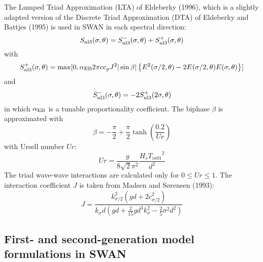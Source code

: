 \documentclass[12pt]{book}
\begin{document}
The Lumped Triad Approximation (LTA) of Eldeberky (1996), which is a slightly adapted version of the
Discrete Triad Approximation (DTA) of Eldeberky and Battjes (1995) is used in SWAN in each spectral direction:
\begin{equation}
  S_{\rm nl3} (\sigma,\theta) = S^-_{\rm nl3} (\sigma,\theta) + S^+_{\rm nl3} (\sigma,\theta)
  \label{eq3-33}
\end{equation}
with
\begin{equation}
  S^+_{\rm nl3} (\sigma,\theta) = \max [0,\alpha_{\rm EB} 2 \pi c c_g J^2 |\sin\beta| \left \{ E^2(\sigma/2,\theta) -
  2 E(\sigma/2,\theta) E(\sigma,\theta) \right \}]
  \label{eq3-34}
\end{equation}
and
\begin{equation}
  S^-_{\rm nl3} (\sigma,\theta) = -2 S^+_{\rm nl3} (2\sigma,\theta)
  \label{eq3-35}
\end{equation}
in which $\alpha _{\rm EB}$ is a tunable proportionality coefficient. The biphase $\beta$ is approximated with
\begin{equation}
  \beta = -\frac{\pi}{2} + \frac{\pi}{2} \tanh (\frac{0.2}{Ur})
  \label{eq3-36}
\end{equation}
with Ursell number $Ur$:
\begin{equation}
  Ur = \frac{g}{8\sqrt{2} \pi^2} \frac{H_s {T_{m01}}^2}{d^2}
  \label{eq3-37}
\end{equation}
The triad wave-wave interactions are calculated only for $0 \leq Ur \leq 1$. The interaction
coefficient $J$ is taken from Madsen and S{\o}rensen (1993):
\begin{equation}
  J = \frac{k^2_{\sigma/2} (gd + 2 c^2_{\sigma/2})}
           {k_\sigma d (gd + \frac{2}{15} gd^3 k^2_\sigma - \frac{2}{5} \sigma^2 d^2)}
  \label{eq3-38}
\end{equation}

\subsection{First- and second-generation model formulations in SWAN} \label{sec:relaxmod}
\end{document}
